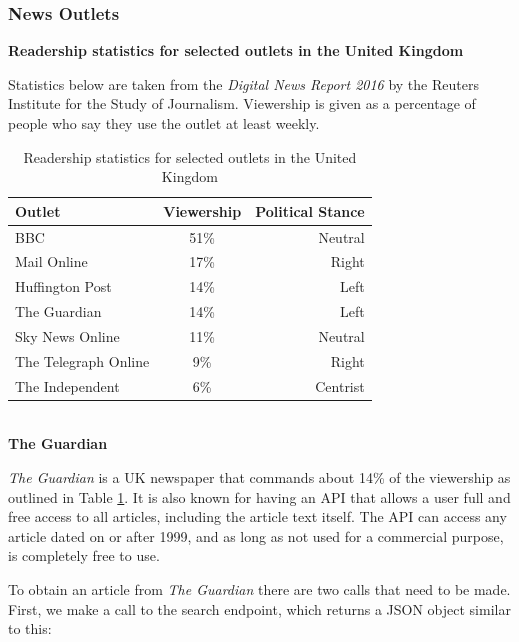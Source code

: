 \documentclass[12pt]{article}
\begin{document}
\subsubsection{News Outlets}

\textbf{Readership statistics for selected outlets in the United Kingdom}

Statistics below are taken from the \emph{Digital News Report 2016}\cite{digitalNewsReport} by the Reuters Institute for the Study of Journalism\cite{reutersInstitute}. Viewership is given as a percentage of people who say they use the outlet at least weekly.

\begin{table}[H]
	\centering
	\begin{tabular}{l|c|r}
		\textbf{Outlet} & \textbf{Viewership} &\textbf{Political Stance} \\ \hline
		BBC\index{BBC} & 51\% & Neutral \\ \hline
		Mail Online\index{Mail Online} & 17\% & Right \\ \hline
		Huffington Post\index{Huffington Post} & 14\% & Left \\ \hline
		The Guardian & 14\% & Left \\ \hline
		Sky News Online\index{Sky News} & 11\% & Neutral \\ \hline
		The Telegraph Online\index{Telegraph, The} & 9\% & Right \\ \hline
		The Independent\index{Independent, The} & 6\% & Centrist \\ \hline
	\end{tabular}
	\caption[Readership statistics for selected UK outlets]{Readership statistics for selected outlets in the United Kingdom}
	\label{viewershipFigures}
\end{table}

\textbf{\\The Guardian\cite{guardian}}

\emph{The Guardian} is a UK newspaper that commands about 14\% of the viewership as outlined in Table \ref{viewershipFigures}. It is also known for having an API that allows a user full and free access to all articles, including the article text itself. The API can access any article dated on or after 1999, and as long as not used for a commercial purpose, is completely free to use. 

To obtain an article from \emph{The Guardian} there are two calls that need to be made. First, we make a call to the search endpoint, which returns a JSON object similar to this:
\end{document}
